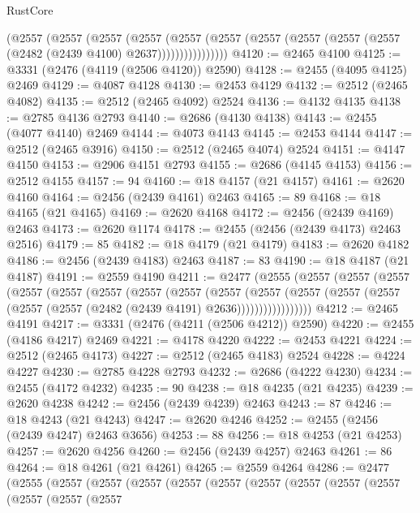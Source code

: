 \begin{lexlean}{RustCore}
\begin{coremodule}
              (@2557
                (@2557
                  (@2557
                    (@2557
                      (@2557
                        (@2557
                          (@2557 (@2557 (@2557 (@2557 (@2482 (@2439 @4100) @2637))))))))))))))))
@4120 := @2465 @4100
@4125 := @3331 (@2476 (@4119 (@2506 @4120)) @2590)
@4128 := @2455 (@4095 @4125) @2469
@4129 := @4087 @4128
@4130 := @2453 @4129
@4132 := @2512 (@2465 @4082)
@4135 := @2512 (@2465 @4092) @2524
@4136 := @4132 @4135
@4138 := @2785 @4136 @2793
@4140 := @2686 (@4130 @4138)
@4143 := @2455 (@4077 @4140) @2469
@4144 := @4073 @4143
@4145 := @2453 @4144
@4147 := @2512 (@2465 @3916)
@4150 := @2512 (@2465 @4074) @2524
@4151 := @4147 @4150
@4153 := @2906 @4151 @2793
@4155 := @2686 (@4145 @4153)
@4156 := @2512 @4155
@4157 := 94
@4160 := @18 @4157 (@21 @4157)
@4161 := @2620 @4160
@4164 := @2456 (@2439 @4161) @2463
@4165 := 89
@4168 := @18 @4165 (@21 @4165)
@4169 := @2620 @4168
@4172 := @2456 (@2439 @4169) @2463
@4173 := @2620 @1174
@4178 := @2455 (@2456 (@2439 @4173) @2463 @2516)
@4179 := 85
@4182 := @18 @4179 (@21 @4179)
@4183 := @2620 @4182
@4186 := @2456 (@2439 @4183) @2463
@4187 := 83
@4190 := @18 @4187 (@21 @4187)
@4191 := @2559 @4190
@4211 := @2477
    (@2555
      (@2557
        (@2557
          (@2557
            (@2557
              (@2557
                (@2557
                  (@2557
                    (@2557
                      (@2557
                        (@2557
                          (@2557
                            (@2557 (@2557 (@2557 (@2557 (@2482 (@2439 @4191) @2636)))))))))))))))))
@4212 := @2465 @4191
@4217 := @3331 (@2476 (@4211 (@2506 @4212)) @2590)
@4220 := @2455 (@4186 @4217) @2469
@4221 := @4178 @4220
@4222 := @2453 @4221
@4224 := @2512 (@2465 @4173)
@4227 := @2512 (@2465 @4183) @2524
@4228 := @4224 @4227
@4230 := @2785 @4228 @2793
@4232 := @2686 (@4222 @4230)
@4234 := @2455 (@4172 @4232)
@4235 := 90
@4238 := @18 @4235 (@21 @4235)
@4239 := @2620 @4238
@4242 := @2456 (@2439 @4239) @2463
@4243 := 87
@4246 := @18 @4243 (@21 @4243)
@4247 := @2620 @4246
@4252 := @2455 (@2456 (@2439 @4247) @2463 @3656)
@4253 := 88
@4256 := @18 @4253 (@21 @4253)
@4257 := @2620 @4256
@4260 := @2456 (@2439 @4257) @2463
@4261 := 86
@4264 := @18 @4261 (@21 @4261)
@4265 := @2559 @4264
@4286 := @2477
    (@2555
      (@2557
        (@2557
          (@2557
            (@2557
              (@2557
                (@2557
                  (@2557
                    (@2557
                      (@2557
                        (@2557
                          (@2557
                            (@2557

\end{coremodule}
\end{lexlean}
